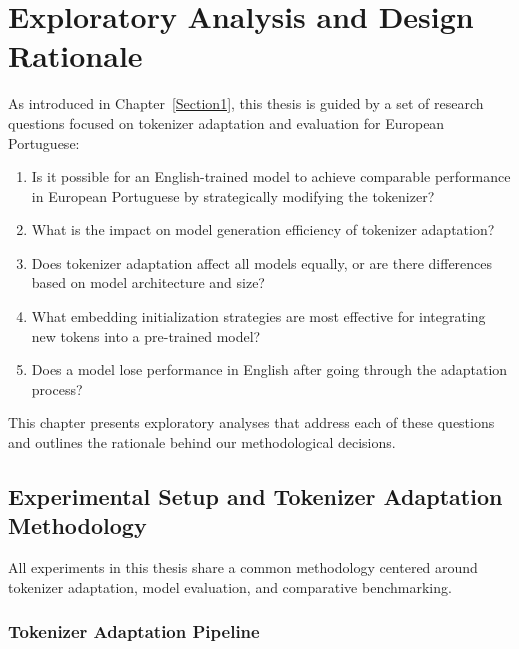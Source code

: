 \chapter{Exploratory Analysis and Design Rationale}
\label{chap:exploration}

As introduced in Chapter~\ref{Section1}, this thesis is guided by a set of research questions focused on tokenizer adaptation and evaluation for European Portuguese:

\begin{enumerate}
    \item Is it possible for an English-trained model to achieve comparable performance in European Portuguese by strategically modifying the tokenizer?
    \item What is the impact on model generation efficiency of tokenizer adaptation?
    \item Does tokenizer adaptation affect all models equally, or are there differences based on model architecture and size?
    \item What embedding initialization strategies are most effective for integrating new tokens into a pre-trained model?
    \item Does a model lose performance in English after going through the adaptation process?
\end{enumerate}

This chapter presents exploratory analyses that address each of these questions and outlines the rationale behind our methodological decisions.

\section{Experimental Setup and Tokenizer Adaptation Methodology}
\label{chap:exploration-sec:setup}

All experiments in this thesis share a common methodology centered around tokenizer adaptation, model evaluation, and comparative benchmarking.

\subsection*{\textbf{Tokenizer Adaptation Pipeline}}

